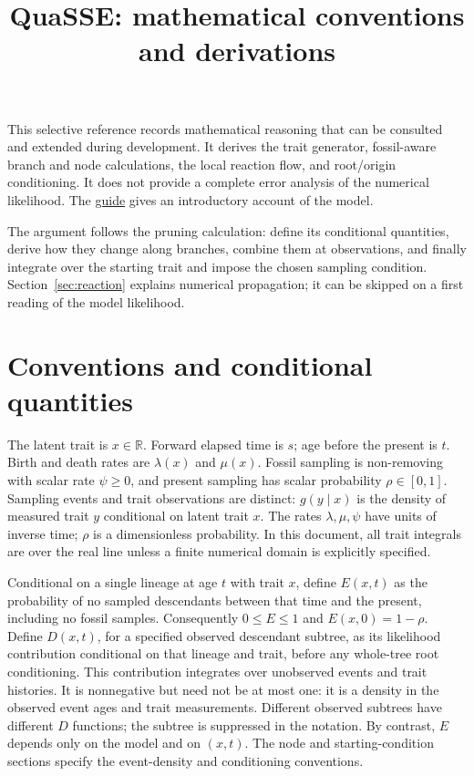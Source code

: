 \documentclass[11pt]{article}
\title{QuaSSE: mathematical conventions and derivations}
\begin{document}
\maketitle

This selective reference records mathematical reasoning that can be consulted and extended during
development. It derives the trait generator, fossil-aware branch and node calculations, the local
reaction flow, and root/origin conditioning. It does not provide a complete error analysis of the
numerical likelihood. The \href{guide.pdf}{guide} gives an introductory account of the model.

The argument follows the pruning calculation: define its conditional quantities, derive how
they change along branches, combine them at observations, and finally integrate over the starting
trait and impose the chosen sampling condition. Section~\ref{sec:reaction} explains numerical
propagation; it can be skipped on a first reading of the model likelihood.

\section{Conventions and conditional quantities}\label{sec:conventions}
The latent trait is $x\in\mathbb{R}$. Forward elapsed time is $s$; age before the present is $t$.
Birth and death rates are $\lambda(x)$ and $\mu(x)$. Fossil sampling is non-removing with scalar
rate $\psi\geq0$, and present sampling has scalar probability $\rho\in[0,1]$. Sampling events
and trait observations are distinct: $g(y\mid x)$ is the density of measured trait $y$ conditional
on latent trait $x$. The rates $\lambda,\mu,\psi$ have units of inverse time; $\rho$ is a
dimensionless probability. In this document, all trait integrals are over the real line unless
a finite numerical domain is explicitly specified.

Conditional on a single lineage at age $t$ with trait $x$, define $E(x,t)$ as the probability of no
sampled descendants between that time and the present, including no fossil samples. Consequently
$0\leq E\leq1$ and $E(x,0)=1-\rho$. Define $D(x,t)$, for a specified observed descendant subtree,
as its likelihood contribution conditional on that lineage and trait, before any whole-tree root
conditioning. This contribution integrates over unobserved events and trait histories. It is
nonnegative but need not be at most one: it is a density in the observed event ages and trait
measurements. Different observed subtrees have different $D$ functions; the subtree is suppressed
in the notation. By contrast, $E$ depends only on the model and on $(x,t)$.
The node and starting-condition sections specify the event-density and conditioning conventions.
\end{document}
